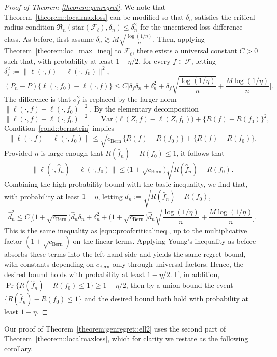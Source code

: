 \documentclass[11pt]{article}
\theoremstyle{plain}
\theoremstyle{definition} %
\newcommand{\Var}{\operatorname{Var}}
\begin{document}
\begin{proof}[Proof of Theorem \ref{theorem:genregret}]
We note that Theorem~\ref{theorem::localmaxloss} can be modified so that \(\delta_n\) satisfies the
critical radius condition \(\mathfrak{R}_n(\mathrm{star}(\mathcal{F}_{\ell}),\delta_n)\le \delta_n^2\)
for the uncentered loss-difference class. As before, first assume
\(\delta_n \gtrsim M\sqrt{\frac{\log(1/\eta)}{n}}\). Then, applying
Theorem~\ref{theorem:loc_max_ineq} to \(\mathcal{F}_{\ell}\), there exists a universal constant
\(C>0\) such that, with probability at least \(1-\eta/2\), for every \(f\in\mathcal{F}\), letting
\(\delta_f^2 := \|\ell(\cdot,f)-\ell(\cdot,f_0)\|^2\),
\[
(P_n-P)\{\ell(\cdot,f_0)-\ell(\cdot,f)\}
\le
C\Biggl[
\delta_f \delta_n
+
\delta_n^2
+
\delta_f \sqrt{\frac{\log(1/\eta)}{n}}
+
\frac{M\log(1/\eta)}{n}
\Biggr].
\]
The difference is that \(\sigma_f^2\) is replaced by the larger norm
\(\|\ell(\cdot,f)-\ell(\cdot,f_0)\|^2\). By the elementary decomposition
\[
\|\ell(\cdot,f)-\ell(\cdot,f_0)\|^2
=
\Var\bigl(\ell(Z,f)-\ell(Z,f_0)\bigr)
+\{R(f)-R(f_0)\}^2,
\]
Condition~\ref{cond::bernstein} implies
\[
\|\ell(\cdot,f)-\ell(\cdot,f_0)\|
\le
\sqrt{c_{\mathrm{Bern}}\,\{R(f)-R(f_0)\}}
+
\{R(f)-R(f_0)\}.
\]
Provided \(n\) is large enough that \(R(\hat f_n)-R(f_0)\le 1\), it follows that
\[
\|\ell(\cdot,\hat f_n)-\ell(\cdot,f_0)\|
\le
\bigl(1+\sqrt{c_{\mathrm{Bern}}}\bigr)\sqrt{R(\hat f_n)-R(f_0)}.
\]
Combining the high-probability bound with the basic inequality, we find that, with probability at
least \(1-\eta\), letting \(\hat d_n := \sqrt{R(\hat f_n)-R(f_0)}\),
\[
\hat d_n^2
\le
C\Biggl[
\bigl(1+\sqrt{c_{\mathrm{Bern}}}\bigr)\hat d_n \delta_n
+
\delta_n^2
+
\bigl(1+\sqrt{c_{\mathrm{Bern}}}\bigr)\hat d_n\sqrt{\frac{\log(1/\eta)}{n}}
+
\frac{M\log(1/\eta)}{n}
\Biggr].
\]
This is the same inequality as \eqref{eqn::proofcriticalineq}, up to the multiplicative factor
\((1+\sqrt{c_{\mathrm{Bern}}})\) on the linear terms. Applying Young's inequality as before absorbs
these terms into the left-hand side and yields the same regret bound, with constants depending on
\(c_{\mathrm{Bern}}\) only through universal factors. Hence, the desired bound holds with probability
at least \(1-\eta/2\). If, in addition, \(\Pr\{R(\hat f_n)-R(f_0)\le 1\}\ge 1-\eta/2\), then by a union
bound the event \(\{R(\hat f_n)-R(f_0)\le 1\}\) and the desired bound both hold with probability at
least \(1-\eta\).




\end{proof}



Our proof of Theorem~\ref{theorem:genregret::ell2} uses the second part of Theorem~\ref{theorem::localmaxloss}, which for clarity we restate as the following corollary.
\end{document}
